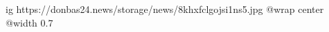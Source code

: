  
 
 
 
 

\ifcmt
  ig https://donbas24.news/storage/news/8khxfclgojsi1ns5.jpg
  @wrap center
  @width 0.7
\fi
